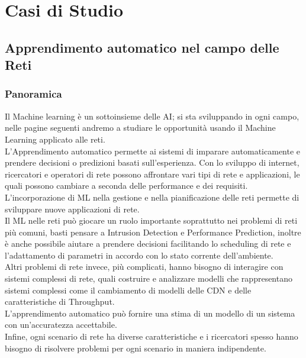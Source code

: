 \documentclass[../tesi.tex]{subfiles}
\begin{document}
\chapter{Casi di Studio}
\section{Apprendimento automatico nel campo delle Reti}



\subsection{Panoramica}

Il Machine learning è un sottoinsieme delle AI; si sta sviluppando in ogni campo, nelle pagine seguenti andremo a studiare le opportunità usando il Machine Learning applicato alle reti.\\
L'Apprendimento automatico permette ai sistemi di imparare automaticamente e prendere decisioni o predizioni basati sull’esperienza.
Con lo sviluppo di internet, ricercatori e operatori di rete possono affrontare vari tipi di rete e applicazioni, le quali possono cambiare a seconda delle performance e dei requisiti.\\
L’incorporazione di ML nella gestione e nella pianificazione delle reti permette di sviluppare nuove applicazioni di rete.\\
Il ML nelle reti può giocare un ruolo importante soprattutto nei problemi di reti più comuni, basti pensare a Intrusion Detection e Performance Prediction, inoltre è anche possibile aiutare a prendere decisioni facilitando lo scheduling di rete e l’adattamento di parametri in accordo con lo stato corrente dell’ambiente.\\
Altri problemi di rete invece, più complicati, hanno bisogno di interagire con sistemi complessi di rete, quali costruire e analizzare modelli che rappresentano sistemi complessi come il cambiamento di modelli delle \Gls{CDN} e delle caratteristiche di \Gls{Throughput}.\\
L'apprendimento automatico può fornire una stima di un modello di un sistema con un’accuratezza accettabile.\\
Infine, ogni scenario di rete ha diverse caratteristiche e i ricercatori spesso hanno bisogno di risolvere problemi per ogni scenario in maniera indipendente.
\end{document}
